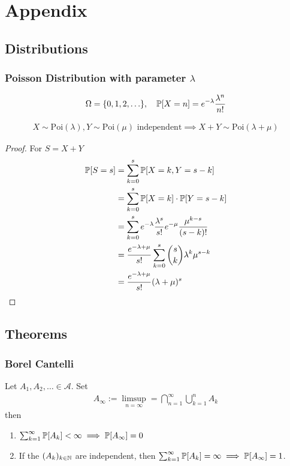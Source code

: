 
\section{Appendix}

\subsection{Distributions}

\subsubsection*{Poisson Distribution with parameter $\lambda$}

\begin{align*}
  \Omega = \{0,1,2,\ldots\}, \quad \mathbb{P}[X=n] = e^{-\lambda} \frac{\lambda^{n}}{n!}
\end{align*}

\begin{align*}
  X \sim \text{Poi}(\lambda), Y \sim \text{Poi}(\mu) \text{ independent} \implies X +Y \sim \text{Poi}(\lambda + \mu)
\end{align*}
\begin{proof}
  For $S = X + Y$
  \begin{align*}
    \mathbb{P}[S = s] 
    &= \sum_{k=0}^{s} \mathbb{P}[X = k, Y = s-k]\\
    &= \sum_{k=0}^{s} \mathbb{P}[X = k] \cdot \mathbb{P}[Y = s-k]\\
    &= \sum_{k=0}^{s} e^{- \lambda} \frac{\lambda^{s}}{s!} e^{- \mu} \frac{\mu^{k-s}}{(s-k)!}\\
    &= \frac{e^{-\lambda + \mu}}{s!}\sum_{k=0}^{s} \binom{s}{k} \lambda^{k} \mu^{s-k}\\
    &= \frac{e^{-\lambda + \mu}}{s!} (\lambda + \mu)^{s}
  \end{align*}
\end{proof}




\subsection{Theorems}

\subsubsection*{Borel Cantelli}

Let $A_1,A_2, \ldots \in \mathcal{A}$. Set
\begin{align*}
  A_{\infty} := \limsup_{n = \infty} = \bigcap_{n=1}^{\infty} \bigcup_{k=1}^{n} A_k
\end{align*}
then
\begin{enumerate}
  \item $\sum_{k=1}^{\infty} \mathbb{P}[A_k] < \infty \implies \mathbb{P}[A_{\infty}] = 0$
  \item If the $(A_k)_{k \in \mathbb{N}}$ are independent, then $\sum_{k=1}^{\infty} \mathbb{P}[A_k] = \infty \implies \mathbb{P}[A_{\infty}] = 1$.
\end{enumerate}



